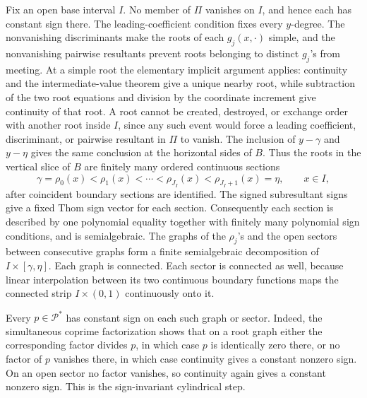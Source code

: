 Fix an open base interval \(I\).  No member of \(\Pi\) vanishes on \(I\), and hence each has constant sign there.  The leading-coefficient condition fixes every \(y\)-degree.  The nonvanishing discriminants make the roots of each \(g_j(x,\cdot)\) simple, and the nonvanishing pairwise resultants prevent roots belonging to distinct \(g_j\)'s from meeting.  At a simple root the elementary implicit argument applies: continuity and the intermediate-value theorem give a unique nearby root, while subtraction of the two root equations and division by the coordinate increment give continuity of that root.  A root cannot be created, destroyed, or exchange order with another root inside \(I\), since any such event would force a leading coefficient, discriminant, or pairwise resultant in \(\Pi\) to vanish.  The inclusion of \(y-\gamma\) and \(y-\eta\) gives the same conclusion at the horizontal sides of \(B\).  Thus the roots in the vertical slice of \(B\) are finitely many ordered continuous sections
\[
\gamma=\rho_0(x)<\rho_1(x)<\cdots<\rho_{J_I}(x)<\rho_{J_I+1}(x)=\eta,
\qquad x\in I,
\]
after coincident boundary sections are identified.  The signed subresultant signs give a fixed Thom sign vector for each section.  Consequently each section is described by one polynomial equality together with finitely many polynomial sign conditions, and is semialgebraic.  The graphs of the \(\rho_j\)'s and the open sectors between consecutive graphs form a finite semialgebraic decomposition of \(I\times[\gamma,\eta]\).  Each graph is connected.  Each sector is connected as well, because linear interpolation between its two continuous boundary functions maps the connected strip \(I\times(0,1)\) continuously onto it.

Every \(p\in\mathscr P^{*}\) has constant sign on each such graph or sector.  Indeed, the simultaneous coprime factorization shows that on a root graph either the corresponding factor divides \(p\), in which case \(p\) is identically zero there, or no factor of \(p\) vanishes there, in which case continuity gives a constant nonzero sign.  On an open sector no factor vanishes, so continuity again gives a constant nonzero sign.  This is the sign-invariant cylindrical step.

